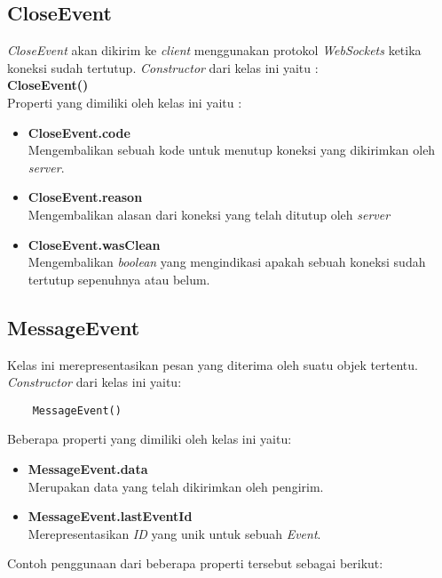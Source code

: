 \subsection{CloseEvent}
\textit{CloseEvent} akan dikirim ke \textit{client} menggunakan protokol \textit{WebSockets} ketika koneksi sudah tertutup. \textit{Constructor} dari kelas ini yaitu : \\

\textbf{CloseEvent()} \\

Properti yang dimiliki oleh kelas ini yaitu : 

\begin{itemize}
	\item \textbf{CloseEvent.code} \\ Mengembalikan sebuah kode untuk menutup koneksi yang dikirimkan oleh \textit{server}.
	\item \textbf{CloseEvent.reason} \\ Mengembalikan alasan dari koneksi yang telah ditutup oleh \textit{server}
	\item \textbf{CloseEvent.wasClean} \\ Mengembalikan \textit{boolean} yang mengindikasi apakah sebuah koneksi sudah tertutup sepenuhnya atau belum.
\end{itemize}



\subsection{MessageEvent}
Kelas ini merepresentasikan pesan yang diterima oleh suatu objek tertentu. \textit{Constructor} dari kelas ini yaitu: 

\begin{lstlisting}
	MessageEvent()
\end{lstlisting}

Beberapa properti yang dimiliki oleh kelas ini yaitu: 

\begin{itemize}
	\item \textbf{MessageEvent.data} \\ Merupakan data yang telah dikirimkan oleh pengirim.
	\item \textbf{MessageEvent.lastEventId} \\ Merepresentasikan \textit{ID} yang unik untuk sebuah \textit{Event}.
\end{itemize}

Contoh penggunaan dari beberapa properti tersebut sebagai berikut:

